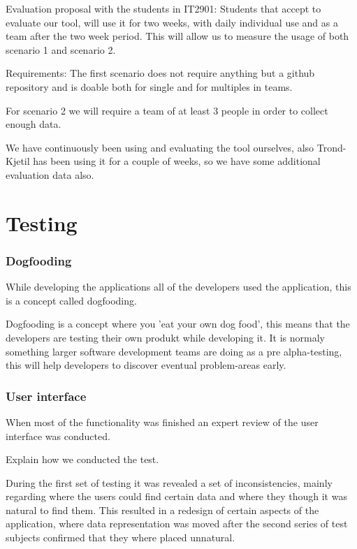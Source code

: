 Evaluation proposal with the students in IT2901: 
Students that accept to evaluate our tool, will use it for two weeks, with daily individual use and as a team after the two week period. This will allow us to measure the
usage of both scenario 1 and scenario 2.

Requirements:
The first scenario does not require anything but a github repository and is doable both for single and for multiples in teams.

For scenario 2 we will require a team of at least 3 people in order to collect enough data. 

We have continuously been using and evaluating the tool ourselves, also Trond-Kjetil has been using it for a couple of weeks, so we have some additional evaluation
data also. 


\section{Testing}
\subsubsection{Dogfooding}
While developing the applications all of the developers used the application, this is a concept called dogfooding.

Dogfooding is a concept where you 'eat your own dog food', this means that the developers are testing their own produkt while developing it. It is normaly something larger software development teams are doing as a pre alpha-testing, this will help developers to discover eventual problem-areas early.

\subsubsection{User interface}
When most of the functionality was finished an expert review of the user interface was conducted.

Explain how we conducted the test.

During the first set of testing it was revealed a set of inconsistencies, mainly regarding where the users could find certain data and where they though it was natural to find them. 
This resulted in a redesign of certain aspects of the application, where data representation was moved after the second series of test subjects confirmed that they where placed unnatural.